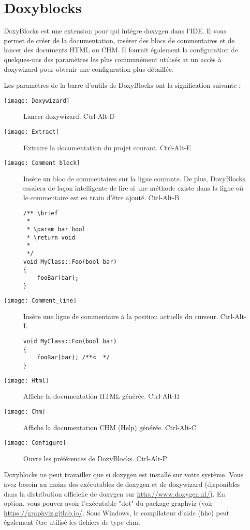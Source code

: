 ﻿\section{Doxyblocks}\label{sec:doxyblocks}

DoxyBlocks est une extension pour \codeblocks qui intègre doxygen dans l'IDE. Il vous permet de créer de la documentation, insérer des blocs de commentaires et de lancer des documents HTML ou CHM. Il fournit également la configuration de quelques-uns des paramètres les plus communément utilisés at un accès à doxywizard pour obtenir une configuration plus détaillée.

Les paramètres de la barre d'outils de DoxyBlocks ont la signification suivante :

\begin{description}
\item[\texttt{[image: Doxywizard]}] Lancer doxywizard. Ctrl-Alt-D
\item[\texttt{[image: Extract]}] Extraire la documentation du projet courant. Ctrl-Alt-E
\item[\texttt{[image: Comment\_block]}] Insère un bloc de commentaires sur la ligne courante. De plus, DoxyBlocks essaiera de façon intelligente de lire si une méthode existe dans la ligne où le commentaire est en train d'être ajouté. Ctrl-Alt-B

\begin{lstlisting}
/** \brief
 *
 * \param bar bool
 * \return void
 *
 */    
void MyClass::Foo(bool bar)
{
    fooBar(bar);
}
\end{lstlisting}

\item[\texttt{[image: Comment\_line]}] Insère une ligne de commentaire à la position actuelle du curseur. Ctrl-Alt-L
\begin{lstlisting}
void MyClass::Foo(bool bar)
{
    fooBar(bar); /**<  */
}
\end{lstlisting}

\item[\texttt{[image: Html]}] Affiche la documentation HTML générée. Ctrl-Alt-H
\item[\texttt{[image: Chm]}] Affiche la documentation CHM (Help) générée. Ctrl-Alt-C
\item[\texttt{[image: Configure]}] Ouvre les préférences de DoxyBlocks. Ctrl-Alt-P
\end{description}

Doxyblocks ne peut travailler que si doxygen est installé sur votre système. Vous avez besoin au moins des exécutables de doxygen et de doxywizard (disponibles dans la distribution officielle de doxygen sur \url{http://www.doxygen.nl/}). En option, vous pouvez avoir l'exécutable "dot" du package graphviz (voir \url{https://graphviz.gitlab.io/}. Sous Windows, le compilateur d'aide (hhc) peut également être utilisé les fichiers de type chm.

